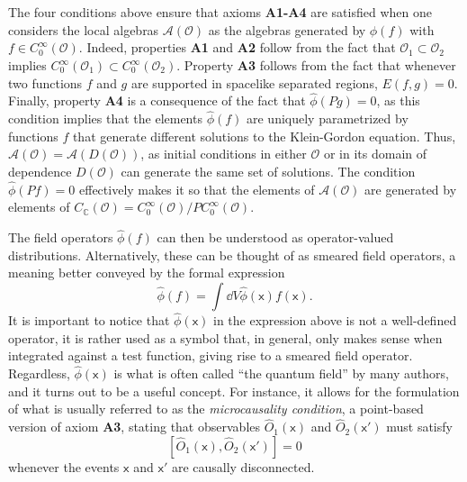 \documentclass[letterpaper,12pt,titlepage,oneside,final]{book}
\newcommand{\mf}{\mathsf}%
\begin{document}
The four conditions above ensure that axioms \textbf{A1-A4} are satisfied when one considers the local algebras $\mathcal{A}(\mathcal{O})$ as the algebras generated by $\hat{\phi}(f)$ with $f\in C_0^\infty(\mathcal{O})$. Indeed, properties \textbf{A1} and \textbf{A2} follow from the fact that $\mathcal{O}_1\subset\mathcal{O}_2$ implies $C_0^\infty(\mathcal{O}_1)\subset C_0^\infty(\mathcal{O}_2)$. Property \textbf{A3} follows from the fact that whenever two functions $f$ and $g$ are supported in spacelike separated regions, $E(f,g) = 0$. Finally, property \textbf{A4} is a consequence of the fact that $\hat{\phi}(Pg) = 0$, as this condition implies that the elements $\hat{\phi}(f)$ are uniquely parametrized by functions $f$ that generate different solutions to the Klein-Gordon equation. Thus, $\mathcal{A}(\mathcal{O}) = \mathcal{A}(D(\mathcal{O}))$, as initial conditions in either $\mathcal{O}$ or in its domain of dependence $D(\mathcal{O})$ can generate the same set of solutions. The condition $\hat{\phi}(Pf) = 0$ effectively makes it so that the elements of $\mathcal{A}(\mathcal{O})$ are generated by elements of $C_\mathbb{C}(\mathcal{O}) = C_0^\infty(\mathcal{O})/PC_0^\infty(\mathcal{O})$.

The field operators $\hat{\phi}(f)$ can then be understood as operator-valued distributions. Alternatively, these can be thought of as smeared field operators, a meaning better conveyed by the formal expression
\begin{equation}\label{eq:phif}
    \hat{\phi}(f) = \int \dd V \hat{\phi}(\mf x) f(\mf x).
\end{equation}
It is important to notice that $\hat{\phi}(\mf x)$ in the expression above is not a well-defined operator, it is rather used as a symbol that, in general, only makes sense when integrated against a test function, giving rise to a smeared field operator. Regardless, $\hat{\phi}(\mf x)$ is what is often called ``the quantum field'' by many authors, and it turns out to be a useful concept. For instance, it allows for the formulation of what is usually referred to as the \textit{microcausality condition}, a point-based version of axiom \textbf{A3}, stating that observables $\hat{O}_1(\mf x)$ and $\hat{O}_2(\mf x')$ must satisfy
\begin{equation}\label{eq:microcausality}
    [\hat{O}_1(\mf x),\hat{O}_2(\mf x')] = 0
\end{equation}
whenever the events $\mf x$ and $\mf x'$ are causally disconnected.
\end{document}
